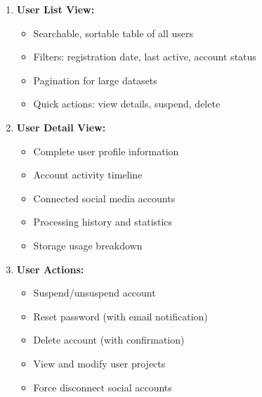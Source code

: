 \begin{enumerate}
    \item \textbf{User List View:}
    \begin{itemize}
        \item Searchable, sortable table of all users
        \item Filters: registration date, last active, account status
        \item Pagination for large datasets
        \item Quick actions: view details, suspend, delete
    \end{itemize}
    
    \item \textbf{User Detail View:}
    \begin{itemize}
        \item Complete user profile information
        \item Account activity timeline
        \item Connected social media accounts
        \item Processing history and statistics
        \item Storage usage breakdown
    \end{itemize}
    
    \item \textbf{User Actions:}
    \begin{itemize}
        \item Suspend/unsuspend account
        \item Reset password (with email notification)
        \item Delete account (with confirmation)
        \item View and modify user projects
        \item Force disconnect social accounts
    \end{itemize}
\end{enumerate}


